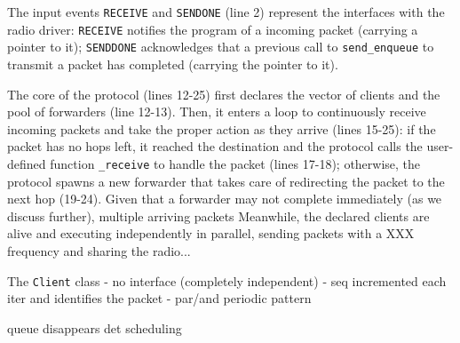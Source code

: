 \documentclass{sigplanconf}
\newcommand{\code}[1] {{\small{\texttt{#1}}}}
\newcommand{\1}{\;}
\newcommand{\2}{\;\;}
\newcommand{\3}{\;\;\;}
\newcommand{\5}{\;\;\;\;\;}
\begin{document}
The input events \code{RECEIVE} and \code{SENDONE} (line 2) represent the 
interfaces with the radio driver:
\code{RECEIVE} notifies the program of a incoming packet (carrying a pointer to 
it);
\code{SENDDONE} acknowledges that a previous call to \code{send\_enqueue} to 
transmit a packet has completed (carrying the pointer to it).

The core of the protocol (lines 12-25) first declares the vector of clients and 
the pool of forwarders (line 12-13).
Then, it enters a loop to continuously receive incoming packets and take the 
proper action as they arrive (lines 15-25):
if the packet has no hops left, it reached the destination and the protocol 
calls the user-defined function \code{\_receive} to handle the packet (lines 
17-18);
otherwise, the protocol spawns a new forwarder that takes care of redirecting 
the packet to the next hop (19-24).
Given that a forwarder may not complete immediately (as we discuss further), 
multiple arriving packets
Meanwhile, the declared clients are alive and executing independently in 
parallel, sending packets with a XXX frequency and sharing the radio...

The \code{Client} class
    - no interface (completely independent)
    - seq incremented each iter and identifies the packet
    - par/and periodic pattern

%
queue disappears
det scheduling
\end{document}

